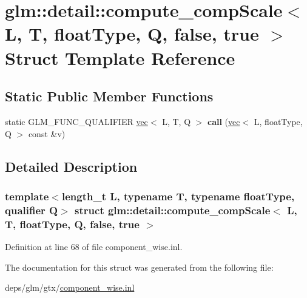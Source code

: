 \hypertarget{structglm_1_1detail_1_1compute__compScale_3_01L_00_01T_00_01floatType_00_01Q_00_01false_00_01true_01_4}{}\section{glm\+:\+:detail\+:\+:compute\+\_\+comp\+Scale$<$ L, T, float\+Type, Q, false, true $>$ Struct Template Reference}
\label{structglm_1_1detail_1_1compute__compScale_3_01L_00_01T_00_01floatType_00_01Q_00_01false_00_01true_01_4}
\subsection*{Static Public Member Functions}
\begin{DoxyCompactItemize}
\item 
\mbox{\label{structglm_1_1detail_1_1compute__compScale_3_01L_00_01T_00_01floatType_00_01Q_00_01false_00_01true_01_4_a5db156b269a3f48e8bcb0e04ed5e1f9e}} 
static G\+L\+M\+\_\+\+F\+U\+N\+C\+\_\+\+Q\+U\+A\+L\+I\+F\+I\+ER \hyperlink{structglm_1_1vec}{vec}$<$ L, T, Q $>$ {\bfseries call} (\hyperlink{structglm_1_1vec}{vec}$<$ L, float\+Type, Q $>$ const \&v)
\end{DoxyCompactItemize}


\subsection{Detailed Description}
\subsubsection*{template$<$length\+\_\+t L, typename T, typename float\+Type, qualifier Q$>$\newline
struct glm\+::detail\+::compute\+\_\+comp\+Scale$<$ L, T, float\+Type, Q, false, true $>$}



Definition at line 68 of file component\+\_\+wise.\+inl.



The documentation for this struct was generated from the following file\+:\begin{DoxyCompactItemize}
\item 
deps/glm/gtx/\hyperlink{component__wise_8inl}{component\+\_\+wise.\+inl}\end{DoxyCompactItemize}
